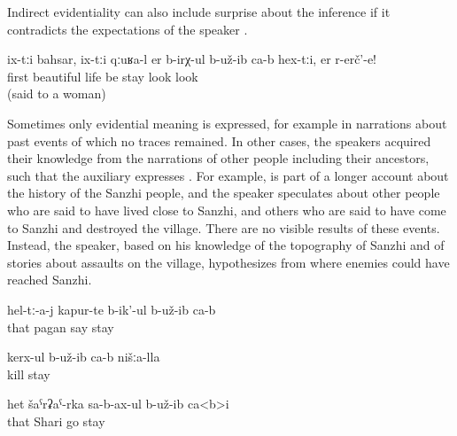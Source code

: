 Indirect evidentiality can also include surprise about the inference if it contradicts the expectations of the speaker .

\begin{exe}
	\ex	\label{ex:(It turned out) they lived well first, look@15}
	\gll	ix-tːi	bahsar,	ix-tːi	qːuʁa-l	er b-irχ-ul	b-už-ib ca-b	hex-tːi,	er	r-erč'-e!\\
			first		beautiful	life be	stay 		look	look\\
	\glt	{} (said to a woman)
\end{exe}

Sometimes only evidential meaning is expressed, for example in narrations about past events of which no traces remained. In other cases, the speakers acquired their knowledge from the narrations of other people including their ancestors, such that the auxiliary expresses . For example,  is part of a longer account about the history of the Sanzhi people, and the speaker speculates about other people who are said to have lived close to Sanzhi, and others who are said to have come to Sanzhi and destroyed the village. There are no visible results of these events. Instead, the speaker, based on his knowledge of the topography of Sanzhi and of stories about assaults on the village, hypothesizes from where enemies could have reached Sanzhi.

\begin{exe}
	\ex	\label{ex:pagans invaded from Shari}
	\begin{xlist}
		\ex	\label{ex:They were (apparently) called pagans}
		\gll	hel-tː-a-j	kapur-te	b-ik'-ul	b-už-ib	ca-b\\
			that	pagan	say	stay	\\
		\glt	{}
	
		\ex	\label{ex:They apparently killed our (people)}
		\gll	kerx-ul	b-už-ib	ca-b		nišːa-lla\\
			kill	stay			\\
		\glt	{}
	
		\ex	\label{ex:They came from Shari (to us)@16}
		\gll	het	šaˁrʡaˁ-rka	sa-b-ax-ul	b-už-ib ca<b>i\\
			that	Shari	go	stay \\
		\glt	{}
	\end{xlist}
\end{exe}

